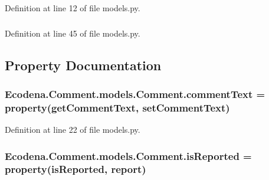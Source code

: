 Definition at line 12 of file models.py.

\hypertarget{class_ecodena_1_1_comment_1_1models_1_1_comment_abe252b90b2a4fcb55b86fcdc12e9ddd5}{
\subsubsection[{userID\_\-f}]{}}
\label{d9/d86/class_ecodena_1_1_comment_1_1models_1_1_comment_abe252b90b2a4fcb55b86fcdc12e9ddd5}


Definition at line 45 of file models.py.



\subsection{Property Documentation}
\hypertarget{class_ecodena_1_1_comment_1_1models_1_1_comment_a38677f64debb3869a68942d57274643a}{
\subsubsection[{commentText}]{\setlength{\rightskip}{0pt plus 5cm}Ecodena.Comment.models.Comment.commentText = property(getCommentText, setCommentText)}}
\label{d9/d86/class_ecodena_1_1_comment_1_1models_1_1_comment_a38677f64debb3869a68942d57274643a}


Definition at line 22 of file models.py.

\hypertarget{class_ecodena_1_1_comment_1_1models_1_1_comment_a420b2edee7b202c70359f71dfed3c353}{
\subsubsection[{isReported}]{\setlength{\rightskip}{0pt plus 5cm}Ecodena.Comment.models.Comment.isReported = property(isReported, report)}}
\label{d9/d86/class_ecodena_1_1_comment_1_1models_1_1_comment_a420b2edee7b202c70359f71dfed3c353}


